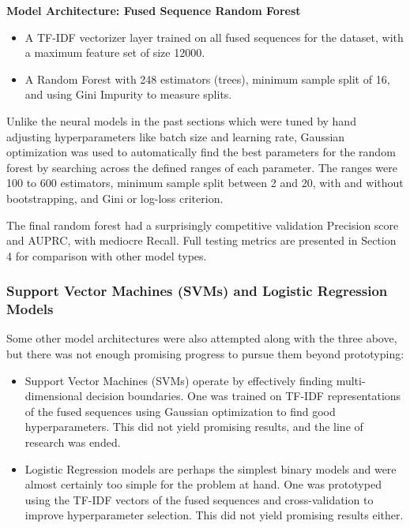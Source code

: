 \documentclass[11pt]{article}
\newenvironment{architecturebox}
  {\par\medskip\noindent\begin{minipage}{\linewidth}\begin{framed}}
  {\end{framed}\end{minipage}\par\medskip}
\begin{document}
\begin{architecturebox}
\noindent\textbf{Model Architecture: Fused Sequence Random Forest}

\begin{itemize}
\item
  A TF-IDF vectorizer layer trained on all fused sequences for the
  dataset, with a maximum feature set of size 12000.
\item
  A Random Forest with 248 estimators (trees), minimum sample split of
  16, and using Gini Impurity to measure splits.
\end{itemize}
\end{architecturebox}

Unlike the neural models in the past sections which were tuned by hand
adjusting hyperparameters like batch size and learning rate, Gaussian
optimization was used to automatically find the best
parameters for the random forest by searching across the defined ranges
of each parameter. The ranges were 100 to 600 estimators, minimum sample
split between 2 and 20, with and without bootstrapping, and Gini or
log-loss criterion.

The final random forest had a surprisingly competitive validation
Precision score and AUPRC, with mediocre Recall. Full testing
metrics are presented in Section 4 for comparison with other model
types.

\subsubsection{Support Vector Machines (SVMs) and Logistic Regression Models}\label{support-vector-machines-svms-and-logistic-regression-models}

Some other model architectures were also attempted along with the three
above, but there was not enough promising progress to pursue them beyond
prototyping:

\begin{itemize}
\item
  Support Vector Machines (SVMs) operate by effectively finding
  multi-dimensional decision boundaries. One was trained on TF-IDF
  representations of the fused sequences using Gaussian optimization to
  find good hyperparameters. This did not yield promising results, and
  the line of research was ended.
\item
  Logistic Regression models are perhaps the simplest binary models and
  were almost certainly too simple for the problem at hand. One was
  prototyped using the TF-IDF vectors of the fused sequences and
  cross-validation to improve hyperparameter selection. This did not
  yield promising results either.
\end{itemize}
\end{document}
